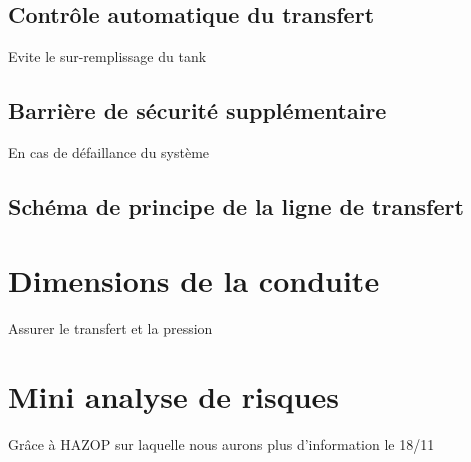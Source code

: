 \documentclass[french, a4paper, 10pt]{article}
\begin{document}
\subsection{Contrôle automatique du transfert}
Evite le sur-remplissage du tank
\subsection{Barrière de sécurité supplémentaire}
En cas de défaillance du système
\subsection{Schéma de principe de la ligne de transfert}

\section{Dimensions de la conduite}
Assurer le transfert et la pression

\section{Mini analyse de risques}
Grâce à HAZOP sur laquelle nous aurons plus d'information le 18/11
\end{document}
